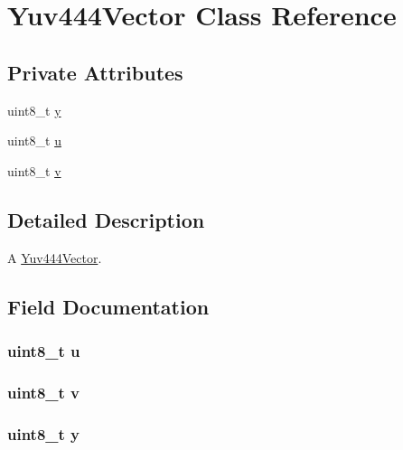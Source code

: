 \hypertarget{classUtility_1_1Yuv444Vector}{}\section{Yuv444\+Vector Class Reference}
\label{classUtility_1_1Yuv444Vector}
\subsection*{Private Attributes}
\begin{DoxyCompactItemize}
\item 
uint8\+\_\+t \hyperlink{classUtility_1_1Yuv444Vector_a17f97f62d93bc8cfb4a2b5d273a2aa72}{y}
\item 
uint8\+\_\+t \hyperlink{classUtility_1_1Yuv444Vector_a02ae6f520370d7aaa739c73180f091b2}{u}
\item 
uint8\+\_\+t \hyperlink{classUtility_1_1Yuv444Vector_a467db8c58dd86cf7c97848f9fc85a4c8}{v}
\end{DoxyCompactItemize}


\subsection{Detailed Description}
A \hyperlink{classUtility_1_1Yuv444Vector}{Yuv444\+Vector}. 

\subsection{Field Documentation}
\hypertarget{classUtility_1_1Yuv444Vector_a02ae6f520370d7aaa739c73180f091b2}{}
\subsubsection[{u}]{\setlength{\rightskip}{0pt plus 5cm}uint8\+\_\+t u\hspace{0.3cm}{\ttfamily [private]}}\label{classUtility_1_1Yuv444Vector_a02ae6f520370d7aaa739c73180f091b2}
\hypertarget{classUtility_1_1Yuv444Vector_a467db8c58dd86cf7c97848f9fc85a4c8}{}
\subsubsection[{v}]{\setlength{\rightskip}{0pt plus 5cm}uint8\+\_\+t v\hspace{0.3cm}{\ttfamily [private]}}\label{classUtility_1_1Yuv444Vector_a467db8c58dd86cf7c97848f9fc85a4c8}
\hypertarget{classUtility_1_1Yuv444Vector_a17f97f62d93bc8cfb4a2b5d273a2aa72}{}
\subsubsection[{y}]{\setlength{\rightskip}{0pt plus 5cm}uint8\+\_\+t y\hspace{0.3cm}{\ttfamily [private]}}\label{classUtility_1_1Yuv444Vector_a17f97f62d93bc8cfb4a2b5d273a2aa72}
